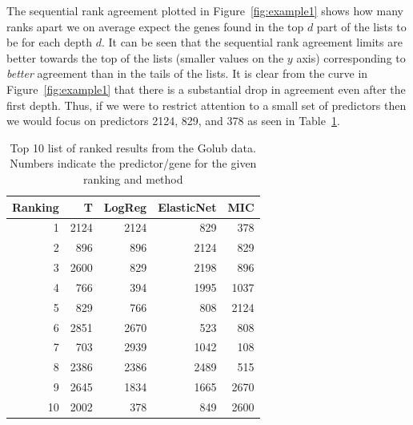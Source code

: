 \documentclass[12pt,a4paper]{article}
\theoremstyle{plain}
\begin{document}
The sequential rank agreement plotted in Figure~\ref{fig:example1}
shows how many ranks apart we on average expect the genes found in the
top $d$ part of the lists to be for each depth $d$.  It can be seen
that the sequential rank agreement limits are better towards the top
of the lists (smaller values on the $y$ axis) corresponding to
\emph{better} agreement than in the tails of the lists. It is clear
from the curve in Figure~\ref{fig:example1} that there is a
substantial drop in agreement even after the first depth. Thus, if we
were to restrict attention to a small set of predictors then we would
focus on predictors 2124, 829, and 378 as seen in Table~\ref{tab1}.













\begin{table}[tb]
\centering
\caption{Top 10 list of ranked results from the Golub data. Numbers indicate the predictor/gene for the given ranking and method} 
\label{tab1}
\begin{tabular}{rrrrr}
  \hline
Ranking & T & LogReg & ElasticNet & MIC \\ 
  \hline
1 & 2124 & 2124 & 829 & 378 \\ 
  2 & 896 & 896 & 2124 & 829 \\ 
  3 & 2600 & 829 & 2198 & 896 \\ 
  4 & 766 & 394 & 1995 & 1037 \\ 
  5 & 829 & 766 & 808 & 2124 \\ 
  6 & 2851 & 2670 & 523 & 808 \\ 
  7 & 703 & 2939 & 1042 & 108 \\ 
  8 & 2386 & 2386 & 2489 & 515 \\ 
  9 & 2645 & 1834 & 1665 & 2670 \\ 
  10 & 2002 & 378 & 849 & 2600 \\ 
   \hline
\end{tabular}
\end{table}
\end{document}
